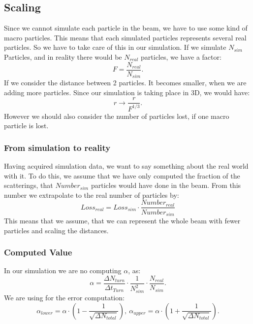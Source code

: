 \subsection{Scaling}
Since we cannot simulate each particle in the beam, we have to use some kind of macro particles. This means that each simulated particles represents several real particles. So we have to take care of this in our simulation. If we simulate $N_{sim}$ Particles, and in reality there would be $N_{real}$ particles, we have a factor:
\begin{equation} F = \frac{N_{real}}{N_{sim}}. \end{equation}
If we consider the distance between 2 particles. It becomes smaller, when we are adding more particles. Since our simulation is taking place in 3D, we would have:
\begin{equation} r \rightarrow \frac r {F^{1/3}}. \end{equation}
However we should also consider the number of particles lost, if one macro particle is lost.

\subsubsection{From simulation to reality}
Having acquired simulation data, we want to say something about the real world with it. To do this, we assume that we have only computed the fraction of the scatterings, that $Number_{sim}$ particles would have done in the beam. From this number we extrapolate to the real number of particles by:
\begin{equation} Loss_{real} = Loss_{sim} \cdot \frac{Number_{real}}{Number_{sim}} \end{equation}
This means that we assume, that we can represent the whole beam with fewer particles and scaling the distances.
\subsubsection{Computed Value}
In our simulation we are no computing $\alpha$, as:
\begin{equation} \alpha = \frac{\Delta N_{turn}}{\Delta t_{Turn}} \cdot \frac 1 {N_{sim} ^2} \cdot  \frac{N_{real}}{N_{sim}}. \end{equation}
We are using for the error computation:
\begin{equation} \alpha_{lower} = \alpha \cdot (1 - \frac 1 {\sqrt{\Delta N_{total}}}), \  \alpha_{upper} = \alpha \cdot (1 + \frac 1 {\sqrt{\Delta N_{total}}}). \end{equation}

